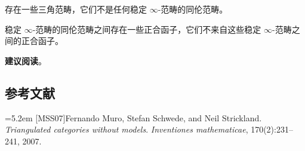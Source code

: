 \nitem\label{L15-A.1} 存在一些三角范畴，它们不是任何稳定 $\infty$-范畴的同伦范畴。

\nitem\label{L15-A.2} 稳定 $\infty$-范畴的同伦范畴之间存在一些正合函子，它们不来自这些稳定 $\infty$-范畴之间的正合函子。

\nitem\label{L15-A.3} \textbf{建议阅读}\quad [MSS07]。

\subsection*{参考文献}
\par\noindent\hangindent=5.2em [MSS07]\hspace{0.6em}Fernando Muro, Stefan Schwede, and Neil Strickland. \emph{Triangulated categories without models}. \emph{Inventiones mathematicae}, 170(2):231--241, 2007.

